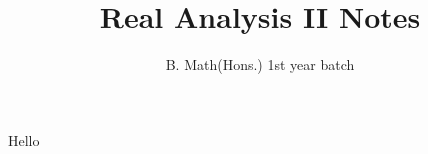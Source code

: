 \documentclass{article}
\title{Real Analysis II Notes}
\author{B. Math(Hons.) 1st year batch}
\date{}
\begin{document}
  \maketitle

	Hello
\end{document}
